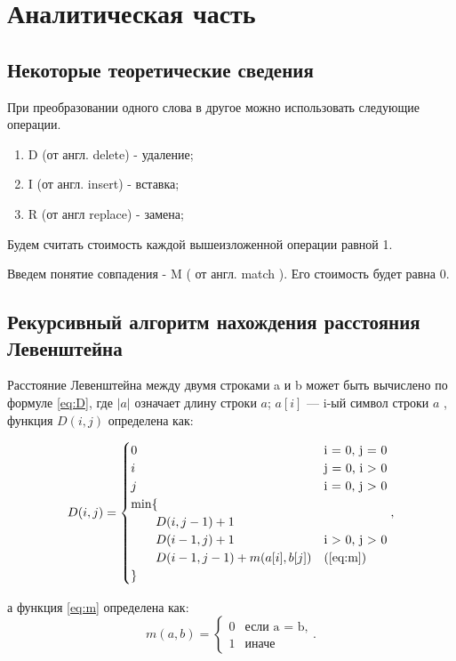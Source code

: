 \chapter{Аналитическая часть}

\section{Некоторые теоретические сведения}

При преобразовании одного слова в другое можно использовать следующие операции.
\begin{enumerate}
\item D (от англ. delete) - удаление;
\item I (от англ. insert) - вставка;
\item R (от англ replace) - замена;
\end{enumerate}

Будем считать стоимость каждой вышеизложенной операции равной 1.

Введем понятие совпадения - M ( от англ. match ). Его стоимость будет
равна 0.

\section{Рекурсивный алгоритм нахождения расстояния Левенштейна}

Расстояние Левенштейна между двумя строками a и b может быть вычислено по формуле \ref{eq:D}, где $|a|$ означает длину строки $a$; $a[i]$ — i-ый символ строки $a$ , функция $D(i, j)$ определена как:

\begin{equation}
	\label{eq:D}
	D(i, j) = \begin{cases}
		0 &\text{i = 0, j = 0}\\
		i &\text{j = 0, i > 0}\\
		j &\text{i = 0, j > 0}\\
		\min \lbrace \\
			\qquad D(i, j-1) + 1\\
			\qquad D(i-1, j) + 1 &\text{i > 0, j > 0}\\
			\qquad D(i-1, j-1) + m(a[i], b[j]) &\text(\ref{eq:m})\\
		\rbrace
	\end{cases},
\end{equation}

а функция \ref{eq:m} определена как:
\begin{equation}
	\label{eq:m}
	m(a, b) = \begin{cases}
		0 &\text{если a = b,}\\
		1 &\text{иначе}
	\end{cases}.
\end{equation}\\

